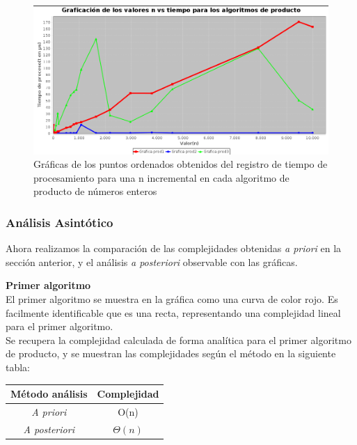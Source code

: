 \documentclass{report}
\begin{document}
            \begin{figure}[!h]
                \centering
                \includegraphics[width=20cm]{Imagenes/ResultadosExperimentalesProductos.png}
                \caption{Gráficas de los puntos ordenados obtenidos del registro de tiempo de procesamiento para una n incremental en cada algoritmo de producto de números enteros}
            \end{figure}
        \subsubsection*{Análisis Asintótico}
            Ahora realizamos la comparación de las complejidades obtenidas \textit{a priori} en la sección anterior, y el análisis \textit{a posteriori} observable con las gráficas.\\
            
            \hfill \break
            
            \textbf{Primer algoritmo}\\
                El primer algoritmo se muestra en la gráfica como una curva de color rojo. Es facilmente identificable que es una recta, representando una complejidad lineal para el primer algoritmo.\\
                Se recupera la complejidad calculada de forma analítica para el primer algoritmo de producto, y se muestran las complejidades según el método en la siguiente tabla:
                
                \begin{table}[h!]
                    \centering
                    \begin{tabular}{c | c}
                        Método análisis & Complejidad \\ \hline
                        \textit{A priori} & O(n)\\
                        \textit{A posteriori} & $\Theta(n)$\\
                    \end{tabular}
                \end{table}
                
\end{document}
